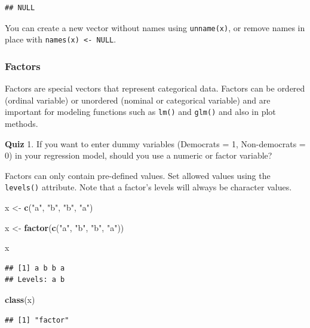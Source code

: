 \documentclass[
]{book}
\newenvironment{Shaded}{\begin{snugshade}}{\end{snugshade}}
\newcommand{\FunctionTok}[1]{\textcolor[rgb]{0.13,0.29,0.53}{\textbf{#1}}}
\newcommand{\NormalTok}[1]{#1}
\newcommand{\OtherTok}[1]{\textcolor[rgb]{0.56,0.35,0.01}{#1}}
\newcommand{\StringTok}[1]{\textcolor[rgb]{0.31,0.60,0.02}{#1}}
\begin{document}
\begin{verbatim}
## NULL
\end{verbatim}

You can create a new vector without names using \texttt{unname(x)}, or remove names in place with \texttt{names(x)\ \textless{}-\ NULL}.

\subsubsection{Factors}\label{factors}

Factors are special vectors that represent categorical data. Factors can be ordered (ordinal variable) or unordered (nominal or categorical variable) and are important for modeling functions such as \texttt{lm()} and \texttt{glm()} and also in plot methods.

\textbf{Quiz}
1. If you want to enter dummy variables (Democrats = 1, Non-democrats = 0) in your regression model, should you use a numeric or factor variable?

Factors can only contain pre-defined values. Set allowed values using the \texttt{levels()} attribute. Note that a factor's levels will always be character values.

\begin{Shaded}
\begin{Highlighting}[]
\NormalTok{x }\OtherTok{\textless{}{-}} \FunctionTok{c}\NormalTok{(}\StringTok{"a"}\NormalTok{, }\StringTok{"b"}\NormalTok{, }\StringTok{"b"}\NormalTok{, }\StringTok{"a"}\NormalTok{)}

\NormalTok{x }\OtherTok{\textless{}{-}} \FunctionTok{factor}\NormalTok{(}\FunctionTok{c}\NormalTok{(}\StringTok{"a"}\NormalTok{, }\StringTok{"b"}\NormalTok{, }\StringTok{"b"}\NormalTok{, }\StringTok{"a"}\NormalTok{))}

\NormalTok{x}
\end{Highlighting}
\end{Shaded}

\begin{verbatim}
## [1] a b b a
## Levels: a b
\end{verbatim}

\begin{Shaded}
\begin{Highlighting}[]
\FunctionTok{class}\NormalTok{(x)}
\end{Highlighting}
\end{Shaded}

\begin{verbatim}
## [1] "factor"
\end{verbatim}
\end{document}
